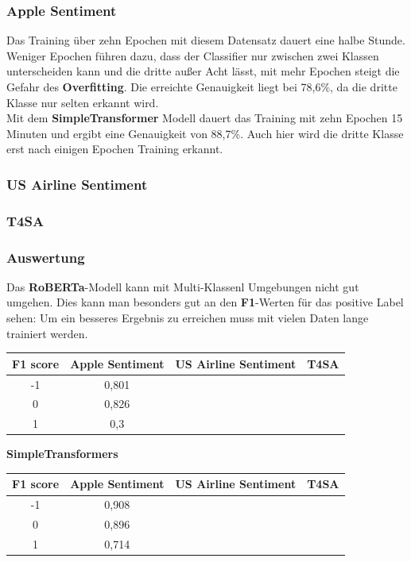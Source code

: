 \subsubsection*{Apple Sentiment}
Das Training \"uber zehn Epochen mit diesem Datensatz dauert eine halbe Stunde. Weniger Epochen f\"uhren dazu, dass der Classifier nur zwischen zwei Klassen unterscheiden kann und die dritte au{\ss}er Acht l\"asst, mit mehr Epochen steigt die Gefahr des \textbf{Overfitting}. Die erreichte Genauigkeit liegt bei 78,6\%, da die dritte Klasse nur selten erkannt wird.\\
Mit dem \textbf{SimpleTransformer} Modell dauert das Training mit zehn Epochen 15 Minuten und ergibt eine Genauigkeit von 88,7\%. Auch hier wird die dritte Klasse erst nach einigen Epochen Training erkannt.

\subsubsection*{US Airline Sentiment}

\subsubsection*{T4SA}

\subsubsection*{Auswertung}
Das \textbf{RoBERTa}-Modell kann mit Multi-Klassenl Umgebungen nicht gut umgehen. Dies kann man besonders gut an den \textbf{F1}-Werten f\"ur das positive Label sehen: Um ein besseres Ergebnis zu erreichen muss mit vielen Daten lange trainiert werden.
\begin{center}
\begin{tabular}{|c||c|c|c|}
\hline
F1 score & Apple Sentiment & US Airline Sentiment & T4SA\\ 
\hline\hline
-1 & 0,801 &  & \\
\hline
0 & 0,826 &  & \\ 
\hline
1 & 0,3 &  & \\
\hline    
\end{tabular}
\end{center}
\textbf{SimpleTransformers}
\begin{center}
\begin{tabular}{|c||c|c|c|}
\hline
F1 score & Apple Sentiment & US Airline Sentiment & T4SA\\ 
\hline\hline
-1 & 0,908 &  & \\
\hline
0 & 0,896 &  & \\ 
\hline
1 & 0,714 &  & \\
\hline    
\end{tabular}
\end{center}

